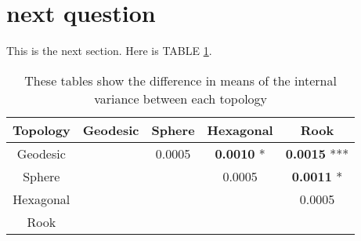 \section{next question}
This is the next section.  Here is TABLE \ref{rlt:all}.
  \begin{table}
  \centering
  \caption{These tables show the difference in means of the internal variance
between each topology}
  \label{rlt:all}
  \begin{tabular}{|c||c|c|c|c|}
  \hline
  \textbf{Topology}&Geodesic&Sphere&Hexagonal&Rook\\\hline
  \hline
  Geodesic&& 0.0005& \textbf{0.0010} *& \textbf{0.0015} ***\\\hline
  Sphere&& & 0.0005& \textbf{0.0011} *\\\hline
  Hexagonal&& & & 0.0005\\\hline
  Rook&& & & \\\hline
  \end{tabular}
  \end{table}

